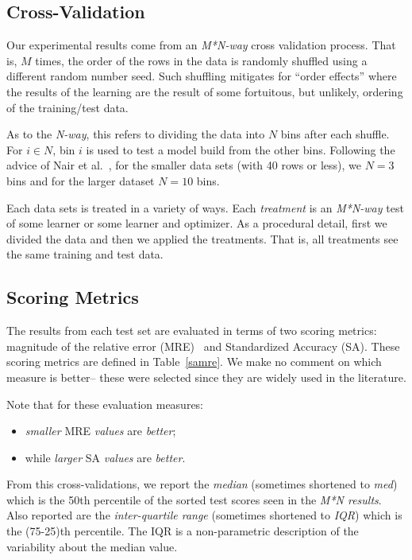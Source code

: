 \documentclass[10pt,conference]{IEEEtran}
\newcommand{\bi}{\begin{itemize}}
\newcommand{\ei}{\end{itemize}}
\begin{document}
 

\subsection{Cross-Validation}


Our experimental results come from  an {\em M*N-way} cross validation process. That is, $M$ times, the order of the rows in the data 
is  randomly shuffled using a different random number seed.
Such shuffling   mitigates for ``order effects'' where the results
of the learning are the result of some fortuitous, but unlikely, ordering of the training/test data.  

As to the {\em N-way}, this refers to dividing the data into $N$ bins after each shuffle.
For $i   \in N$, bin $i$ is used to test a model
build from the other bins.
Following the advice
of Nair et al.~\cite{nair18}, for the smaller data sets (with 40 rows or less), we $N=3$  bins
and for the larger dataset $N=10$ bins.   

Each data sets is treated in a variety of  ways. Each {\em treatment} is an {\em M*N-way} test of some learner or some learner and optimizer.
As a procedural detail, first we divided the data and then we applied the treatments. That is, all treatments see the same training and test data.


\subsection{Scoring Metrics}

The results from each test set are evaluated in terms of two scoring metrics:  magnitude of the relative error (MRE)~\cite{Conte:1986:SEM:6176} and Standardized Accuracy (SA). These scoring metrics  are defined in Table~\ref{samre}.
We make no comment
on which   measure is better-- these were selected since they are widely used in the literature.

Note that for these evaluation measures:
\bi
\item {\em smaller} MRE {\em values} are {\em better};
\item
while {\em larger} SA {\em values} are {\em better}.
\ei
From this cross-validations,
we  report the {\em median} (sometimes shortened to {\em med})
which is the 50th percentile of the sorted test scores seen in the {\em M*N results}.
Also reported are the  {\em inter-quartile range} (sometimes shortened to {\em IQR}) which is the (75-25)th percentile.
The IQR is a  non-parametric
description of the   variability about the median value.  
\end{document}
